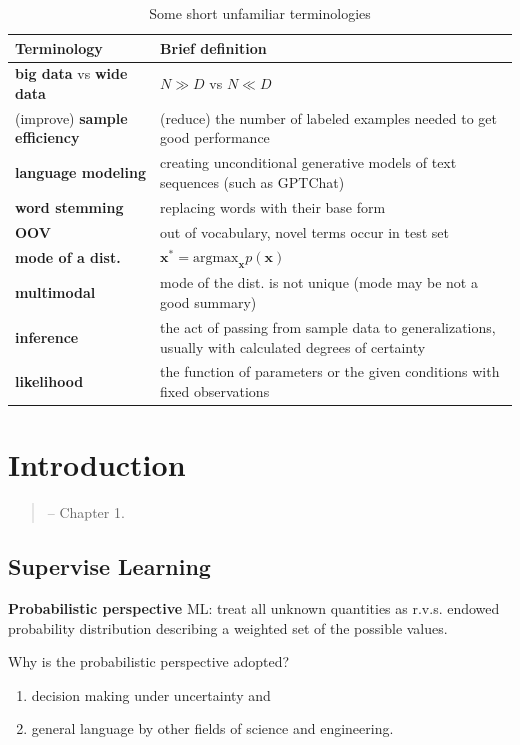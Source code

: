 \begin{table}[htpb]
    \centering
    \caption{Some short unfamiliar terminologies}
    {\small
    \begin{tabular}{p{8em}p{26em}}
        \toprule
        Terminology & Brief definition \\
        \midrule
        \textbf{big data} vs \textbf{wide data} & $N\gg{D}$ vs $N\ll{D}$ \\
        (improve) \textbf{sample efficiency} & (reduce) the number of labeled examples needed to get good performance \\
        \textbf{language modeling} & creating unconditional generative models of text sequences (such as GPTChat)\\
        \textbf{word stemming} & replacing words with their base form\\
        \textbf{OOV} & out of vocabulary, novel terms occur in test set\\
        \textbf{mode of a dist.} & $\boldsymbol{x}^*=\mathrm{argmax}_{\boldsymbol{x}}p(\boldsymbol{x})$ \\
        \textbf{multimodal} & mode of the dist. is not unique (mode may be not a good summary)\\
        \textbf{inference} & the act of passing from sample data to generalizations, usually with calculated degrees of certainty\\
        \textbf{likelihood} & the function of parameters or the given conditions with fixed observations\\

        \bottomrule
    \end{tabular}}
    \label{tab:newtermch1}
\end{table}


\section{Introduction}
\begin{quote}
    \citep{pml1Book} -- Chapter 1.
\end{quote}

\subsection{Supervise Learning}
\textbf{Probabilistic perspective} ML: treat all unknown quantities as r.v.s.
endowed probability distribution describing a weighted set of the possible values.

\begin{note}
    Why is the probabilistic perspective adopted?
    \begin{enumerate}
        \item decision making under uncertainty and
        \item general language by other fields of science and engineering.
    \end{enumerate}
\end{note}


